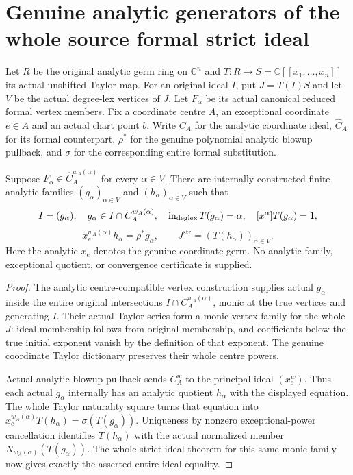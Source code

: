 \section{Genuine analytic generators of the whole source formal strict ideal}

Let $R$ be the original analytic germ ring on $\mathbb C^n$ and
$T:R\to S=\mathbb C[[x_1,\ldots,x_n]]$ its actual unshifted Taylor map.
For an original ideal $I$, put $J=T(I)S$ and let $V$ be the actual degree-lex
vertices of $J$. Let $F_\alpha$ be its actual canonical reduced formal
vertex members. Fix a coordinate centre $A$, an exceptional coordinate
$e\in A$ and an actual chart point $b$. Write $C_A$ for the analytic
coordinate ideal, $\widehat C_A$ for its formal counterpart, $\rho^*$
for the genuine polynomial analytic blowup pullback, and $\sigma$ for
the corresponding entire formal substitution.

\begin{theorem}
\label{hir:actual-analytic-quotient-formal-strict-generators}
\leanok
Suppose $F_\alpha\in\widehat C_A^{w_A(\alpha)}$ for every $\alpha\in V$.
There are internally constructed finite analytic families
$(g_\alpha)_{\alpha\in V}$ and $(h_\alpha)_{\alpha\in V}$ such that
\[
 I=(g_\alpha),\quad
 g_\alpha\in I\cap C_A^{w_A(\alpha)},\quad
 \operatorname{in}_{\operatorname{deglex}}T(g_\alpha)=\alpha,\quad
 [x^\alpha]T(g_\alpha)=1,
\]
\[
 x_e^{w_A(\alpha)}h_\alpha=\rho^*g_\alpha,
 \qquad J^{\mathrm{str}}=(T(h_\alpha))_{\alpha\in V}.
\]
Here the analytic $x_e$ denotes the genuine coordinate germ. No analytic
family, exceptional quotient, or convergence certificate is supplied.
\end{theorem}
\begin{proof}
The analytic centre-compatible vertex construction supplies actual
$g_\alpha$ inside the entire original intersections
$I\cap C_A^{w_A(\alpha)}$, monic at the true vertices and generating $I$.
Their actual Taylor series form a monic vertex family for the whole $J$:
ideal membership follows from original membership, and coefficients below
the true initial exponent vanish by the definition of that exponent.
The genuine coordinate Taylor dictionary preserves their whole centre powers.

Actual analytic blowup pullback sends $C_A^w$ to the principal ideal
$(x_e^w)$. Thus each actual $g_\alpha$ internally has an analytic quotient
$h_\alpha$ with the displayed equation. The whole Taylor naturality square
turns that equation into
$x_e^{w_A(\alpha)}T(h_\alpha)=\sigma(T(g_\alpha))$.
Uniqueness by nonzero exceptional-power cancellation identifies
$T(h_\alpha)$ with the actual normalized member
$N_{w_A(\alpha)}(T(g_\alpha))$. The whole strict-ideal theorem for this
same monic family now gives exactly the asserted entire ideal equality.
\end{proof}

